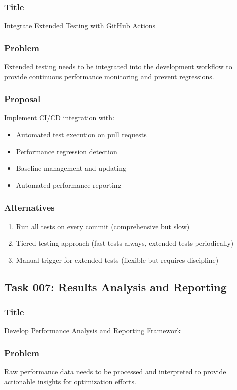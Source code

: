 \documentclass[11pt,a4paper]{article}
\begin{document}
\subsubsection{Title}
Integrate Extended Testing with GitHub Actions

\subsubsection{Problem}
Extended testing needs to be integrated into the development workflow to provide continuous performance monitoring and prevent regressions.

\subsubsection{Proposal}
Implement CI/CD integration with:
\begin{itemize}
    \item Automated test execution on pull requests
    \item Performance regression detection
    \item Baseline management and updating
    \item Automated performance reporting
\end{itemize}

\subsubsection{Alternatives}
\begin{enumerate}
    \item Run all tests on every commit (comprehensive but slow)
    \item Tiered testing approach (fast tests always, extended tests periodically)
    \item Manual trigger for extended tests (flexible but requires discipline)
\end{enumerate}

\subsection{Task 007: Results Analysis and Reporting}

\subsubsection{Title}
Develop Performance Analysis and Reporting Framework

\subsubsection{Problem}
Raw performance data needs to be processed and interpreted to provide actionable insights for optimization efforts.
\end{document}
